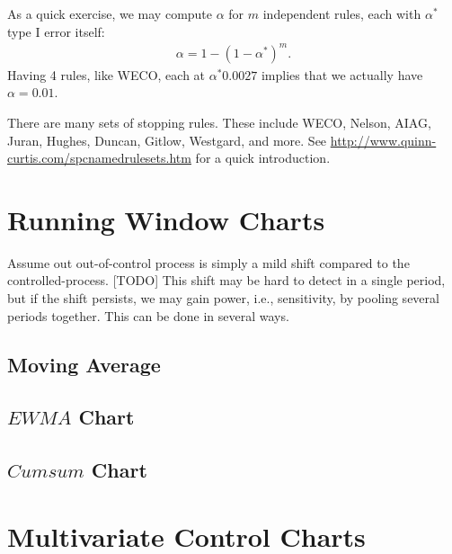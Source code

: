 As a quick exercise, we may compute $\alpha$  for $m$ independent rules, each with $\alpha^*$ type I error itself:
\begin{align}
	\alpha=1-(1-\alpha^*)^m.
\end{align}
Having 4 rules, like WECO, each at $\alpha^*0.0027$ implies that we actually have $\alpha=0.01$.

\begin{extra}
There are many sets of stopping rules. 
These include WECO, Nelson, AIAG, Juran, Hughes, Duncan, Gitlow, Westgard, and more. 
See \url{http://www.quinn-curtis.com/spcnamedrulesets.htm} for a quick introduction.
\end{extra}



\section{Running Window Charts}
\label{sec:running_windows}

Assume out out-of-control process is simply a mild shift compared to the controlled-process.
[TODO]
This shift may be hard to detect in a single period, but if the shift persists, we may gain power, i.e., sensitivity, by pooling several periods together. 
This can be done in several ways.

\subsection{Moving Average}

\subsection{$EWMA$ Chart}

\subsection{$Cumsum$ Chart}


\begin{extra}
\end{extra}








\section{Multivariate Control Charts}
\label{sec:multivariate}




